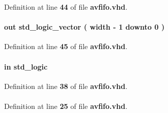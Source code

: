 Definition at line {\bf 44} of file {\bf avfifo.\+vhd}.

\paragraph[{readdata}]{ {\bfseries \textcolor{keywordflow}{out}\textcolor{vhdlchar}{ }} {\bfseries \textcolor{comment}{std\+\_\+logic\+\_\+vector}\textcolor{vhdlchar}{ }\textcolor{vhdlchar}{(}\textcolor{vhdlchar}{ }\textcolor{vhdlchar}{ }\textcolor{vhdlchar}{ }\textcolor{vhdlchar}{ }{\bfseries {\bf width}} \textcolor{vhdlchar}{-\/}\textcolor{vhdlchar}{ } \textcolor{vhdldigit}{1} \textcolor{vhdlchar}{ }\textcolor{keywordflow}{downto}\textcolor{vhdlchar}{ }\textcolor{vhdlchar}{ } \textcolor{vhdldigit}{0} \textcolor{vhdlchar}{ }\textcolor{vhdlchar}{)}\textcolor{vhdlchar}{ }} \hspace{0.3cm}{\ttfamily [Port]}}\label{classavfifo_a7de0b16136079fc4665287aee3cad9f6}


Definition at line {\bf 45} of file {\bf avfifo.\+vhd}.

\paragraph[{rsi\+\_\+nrst}]{ {\bfseries \textcolor{keywordflow}{in}\textcolor{vhdlchar}{ }} {\bfseries \textcolor{comment}{std\+\_\+logic}\textcolor{vhdlchar}{ }} \hspace{0.3cm}{\ttfamily [Port]}}\label{classavfifo_a8f5074515cd4699fd14d2dbc751dcb2e}


Definition at line {\bf 38} of file {\bf avfifo.\+vhd}.

\paragraph[{std\+\_\+logic\+\_\+1164}]{\hspace{0.3cm}{\ttfamily [Package]}}\label{classavfifo_acd03516902501cd1c7296a98e22c6fcb}


Definition at line {\bf 25} of file {\bf avfifo.\+vhd}.

